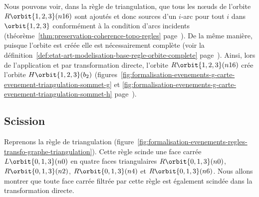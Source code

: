 Nous pouvons voir, dans la règle de triangulation, que tous les n\oe uds de
l'orbite $R\orbit{1,2,3}(n16)$ sont ajoutés et donc sources d'un $i$-arc pour
tout $i$ dans $\orbit{1,2,3}$ conformément à la condition d'arcs incidents
(théorème~\ref{thm:preservation-coherence-topo-regles}
page~\pageref{thm:preservation-coherence-topo-regles}). %
De la même manière, puisque l'orbite est créée elle est nécessairement complète
(voir la définition~\ref{def:etat-art-modelisation-base-regle-orbite-complete}
page~\pageref{def:etat-art-modelisation-base-regle-orbite-complete}). %
Ainsi, lors de l'application et par transformation directe, l'orbite
$R\orbit{1,2,3}(n16)$ crée l'orbite $H\orbit{1,2,3}(b_{2})$
(figures~\ref{fig:formalisation-evenements-g-carte-evenement-triangulation-sommet-g}
et \ref{fig:formalisation-evenements-g-carte-evenement-triangulation-sommet-h}
page~\pageref{fig:formalisation-evenements-g-carte-evenement-triangulation-sommet-g}). %

\subsection{Scission}
\label{sec:formalisation-evenements-regles-transfo-graphe-scission}


Reprenons la règle de triangulation
(figure~\ref{fig:formalisation-evenements-regles-transfo-graphe-triangulation}). %
Cette règle scinde une face carrée $L\orbit{0,1,3}(n0)$ en quatre faces
triangulaires $R\orbit{0,1,3}(n0)$, $R\orbit{0,1,3}(n2)$, $R\orbit{0,1,3}(n4)$
et $R\orbit{0,1,3}(n6)$. %
Nous allons montrer que toute face carrée filtrée par cette règle est également
scindée dans la transformation directe. %

